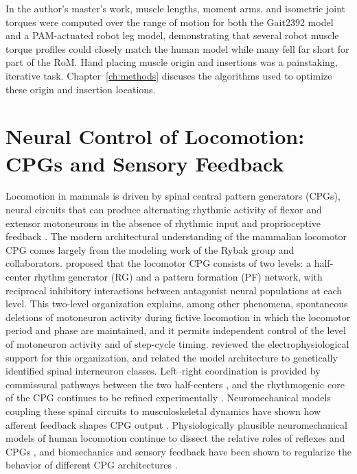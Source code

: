 In the author's master's work, muscle lengths, moment arms, and isometric joint torques were computed over the range of motion for both the Gait2392 model and a PAM-actuated robot leg model, demonstrating that several robot muscle torque profiles could closely match the human model while many fell far short for part of the RoM\citep{bolen_bipedal_2019, bolen_determination_2019}. Hand placing muscle origin and insertions was a painstaking, iterative task. Chapter~\ref{ch:methods} discuses the algorithms used to optimize these origin and insertion locations. 

\section{Neural Control of Locomotion: CPGs and Sensory Feedback}\label{sec:bg_neural}

Locomotion in mammals is driven by spinal central pattern generators (CPGs), neural circuits that can produce alternating rhythmic activity of flexor and extensor motoneurons in the absence of rhythmic input and proprioceptive feedback \citep{brown_intrinsic_1911, rybak_modelling_2006}. The modern architectural understanding of the mammalian locomotor CPG comes largely from the modeling work of the Rybak group and collaborators. \citet{rybak_modelling_2006} proposed that the locomotor CPG consists of two levels: a half-center rhythm generator (RG) and a pattern formation (PF) network, with reciprocal inhibitory interactions between antagonist neural populations at each level. This two-level organization explains, among other phenomena, spontaneous deletions of motoneuron activity during fictive locomotion in which the locomotor period and phase are maintained, and it permits independent control of the level of motoneuron activity and of step-cycle timing. \citet{mccrea_organization_2008} reviewed the electrophysiological support for this organization, and \citet{rybak_organization_2015} related the model architecture to genetically identified spinal interneuron classes. Left--right coordination is provided by commissural pathways between the two half-centers \citep{molkov_mechanisms_2015, danner_central_2016}, and the rhythmogenic core of the CPG continues to be refined experimentally \citep{rancic_recent_2021}. Neuromechanical models coupling these spinal circuits to musculoskeletal dynamics have shown how afferent feedback shapes CPG output \citep{markin_afferent_2010, shevtsova_modeling_2016}. Physiologically plausible neuromechanical models of human locomotion continue to dissect the relative roles of reflexes and CPGs \citep{dirusso_investigating_2023}, and biomechanics and sensory feedback have been shown to regularize the behavior of different CPG architectures \citep{deng_biomechanical_2022}.

